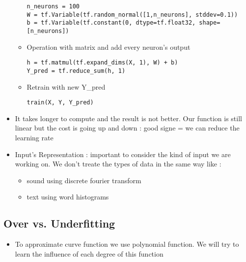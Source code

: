 \documentclass[12pt,a4paper]{article}
\begin{document}
\begin{itemize}
\begin{itemize}
\begin{lstlisting}
n_neurons = 100
W = tf.Variable(tf.random_normal([1,n_neurons], stddev=0.1))
b = tf.Variable(tf.constant(0, dtype=tf.float32, shape=[n_neurons])
\end{lstlisting}
\item Operation with matrix and add every neuron's output
\begin{lstlisting}
h = tf.matmul(tf.expand_dims(X, 1), W) + b)
Y_pred = tf.reduce_sum(h, 1)
\end{lstlisting}
\item Retrain with new Y\_pred
\begin{lstlisting}
train(X, Y, Y_pred)
\end{lstlisting}
\end{itemize}
\item It takes longer to compute and the result is not better. Our function is still linear but the cost is going up and down : good signe = we can reduce the learning rate
\item Input's Representation : important to consider the kind of input we are working on. We don't treate the types of data in the same way like :
\begin{itemize}
\item sound using discrete fourier transform
\item text using word histograms
\end{itemize}
\end{itemize}
\subsection{Over vs. Underfitting}
\begin{itemize}
\item To approximate curve function we use polynomial function. We will try to learn the influence of each degree of this function
\end{itemize}
\end{document}
